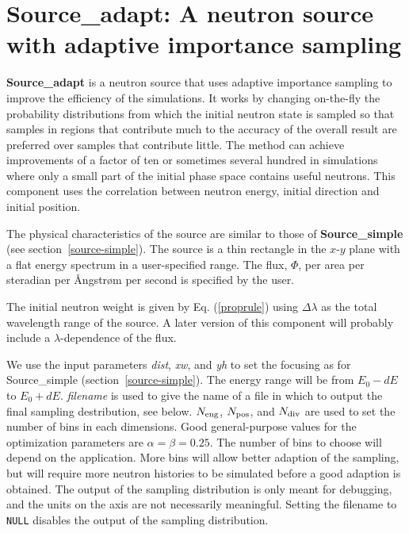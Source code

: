 \section{Source\_adapt: A neutron source with adaptive importance sampling}
\label{s:Source_adapt}
\label{s:source-adapt}


{\bf Source\_adapt} is a neutron source that uses adaptive
importance sampling to improve the efficiency of the simulations. It
works by changing on-the-fly the probability distributions from which
the initial neutron state is sampled so that samples in regions that
contribute much to the accuracy of the overall result are preferred over
samples that contribute little. The method can achieve improvements of a
factor of ten or sometimes several hundred in simulations where only a
small part of the initial phase space contains useful neutrons.
This component uses the correlation between neutron energy,
initial direction and initial position.

The physical characteristics of the source are similar to those of
{\bf Source\_simple} (see section~\ref{source-simple}). The source is a thin
rectangle in the $x$-$y$ plane with a flat energy spectrum in a
user-specified range. The flux, $\Phi$, per area per steradian per
{\AA}ngstr{\o}m per second is specified by the user.

The initial neutron weight is given by Eq. (\ref{proprule}) using
$\Delta\lambda$ as the total wavelength range of the source.
A later version of this component will probably include a
$\lambda$-dependence of the flux.

We use the input parameters \textit{dist}, \textit{xw}, and \textit{yh}
to set the focusing as for Source\_simple (section~\ref{source-simple}).
The energy range will be from $E_0 - dE$ to $E_0 + dE$.
\textit{filename} is used to give the name of a file in which to
output the final sampling destribution, see below.
$N_{\rm eng}$, $N_{\rm pos}$, and $N_{\rm div}$
are used to set the number of bins in each dimensions.
Good general-purpose values for the optimization parameters are
$\alpha = \beta = 0.25$. The number of bins to choose will depend on the
application. More bins will allow better adaption of the sampling, but
will require more neutron histories to be simulated before a good
adaption is obtained. The output of the sampling distribution is only
meant for debugging, and the units on the axis are not necessarily
meaningful. Setting the filename to \verb+NULL+ disables the output of
the sampling distribution.


